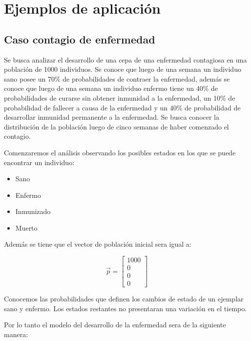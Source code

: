 \section{Ejemplos de aplicación}

\subsection{Caso contagio de enfermedad}
Se busca analizar el desarrollo de una cepa de una enfermedad contagiosa en una población de 1000 individuos. Se conoce que luego de una semana un individuo sano posee un 70\% de probabilidades de contraer la enfermedad, además se conoce que luego de una semana un individuo enfermo tiene un 40\% de probabilidades de curarse sin obtener inmunidad a la enfermedad, un 10\% de probabilidad de fallecer a causa de la enfermedad y un 40\% de probabilidad de desarrollar inmunidad permanente a la enfermedad. Se busca conocer la distribución de la población luego de cinco semanas de haber comenzado el contagio.

Comenzaremos el análisis observando los posibles estados en los que se puede encontrar un individuo:

\begin{itemize}
    \item Sano
    \item Enfermo
    \item Inmunizado
    \item Muerto
\end{itemize}

Además se tiene que el vector de población inicial sera igual a:

\[
    \vec{p} = 
    \left[
    \begin{array}{c}
        1000\\
        0\\
        0\\
        0
    \end{array}
    \right]
\]

Conocemos las probabilidades que definen los cambios de estado de un ejemplar sano y enfermo. Los estados restantes no presentaran una variación en el tiempo. 



Por lo tanto el modelo del desarrollo de la enfermedad sera de la siguiente manera:

